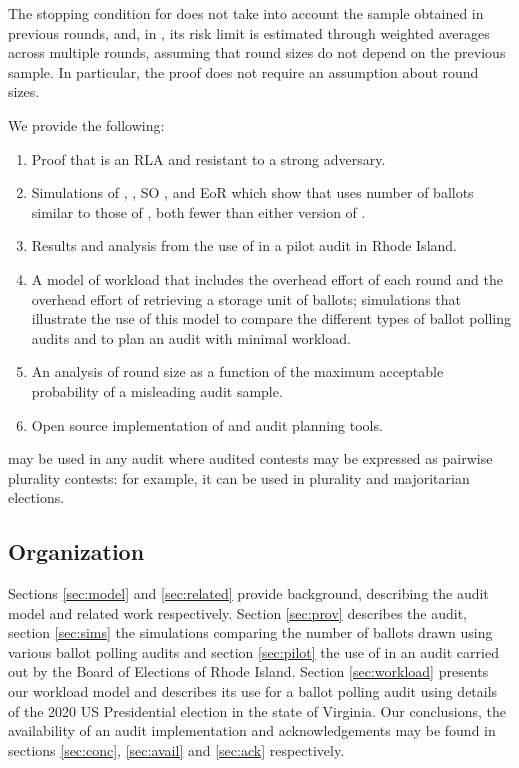 The stopping condition for \Minerva does not take into account the sample obtained in previous rounds, and, in \cite{usenix_minerva}, its risk limit is estimated through weighted averages across multiple rounds, assuming that round sizes do not depend on the previous sample. 
In particular, the proof does not require an assumption about round sizes. 

We provide the following:
\begin{enumerate}
\item Proof that \Providence is an RLA and resistant to a strong adversary.
\item Simulations of \Providence, \Minerva, SO \BRAVO, and EoR \BRAVO which show that \Providence uses number of ballots similar to those of \Minerva, both fewer than either version of \BRAVO.
\item Results and analysis from the use of \Providence in a pilot audit in Rhode Island.
\item A model of workload that includes the overhead effort of each round and the overhead effort of retrieving a storage unit of ballots; simulations that illustrate the use of this model to compare the different types of ballot polling audits and to plan an audit with minimal workload.
\item An analysis of round size as a function of the maximum acceptable probability of a misleading audit sample.
\item Open source implementation of \Providence and audit planning tools. 
\end{enumerate}

\Providence may be used in any audit where audited contests may be expressed as pairwise plurality contests: for example, it can be used in plurality and majoritarian elections. 


\subsection{Organization} 
Sections \ref{sec:model} and \ref{sec:related} provide background, describing the audit model and related work respectively. Section \ref{sec:prov} describes the \Providence audit, section \ref{sec:sims} the simulations comparing the number of ballots drawn using various ballot polling audits and section \ref{sec:pilot} the use of \Providence in an audit carried out by the Board of Elections of Rhode Island. Section \ref{sec:workload} presents our workload model and describes its use for a ballot polling audit using details of the 2020 US Presidential election in the state of Virginia. Our conclusions, the availability of an audit implementation and acknowledgements may be found in sections \ref{sec:conc}, \ref{sec:avail} and \ref{sec:ack} respectively. 

